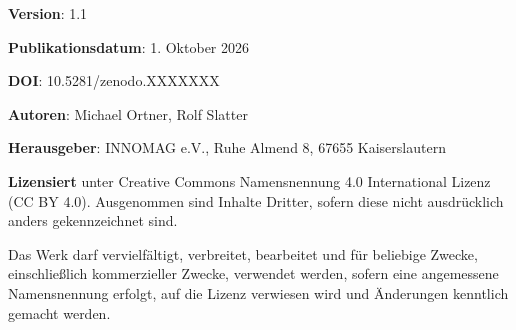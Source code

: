 \cleardoublepage
\thispagestyle{empty}

\textbf{Version}: 1.1

\textbf{Publikationsdatum}: 1. Oktober 2026

\textbf{DOI}: 10.5281/zenodo.XXXXXXX
\vspace{1.0cm}

\textbf{Autoren}: Michael Ortner, Rolf Slatter

\textbf{Herausgeber}: INNOMAG e.V., Ruhe Almend 8, 67655 Kaiserslautern
\vspace{1.0cm}

\textbf{Lizensiert} unter Creative Commons Namensnennung 4.0 International Lizenz (CC BY 4.0). Ausgenommen sind Inhalte Dritter, sofern diese nicht ausdrücklich anders gekennzeichnet sind.

Das Werk darf vervielfältigt, verbreitet, bearbeitet und für beliebige Zwecke, einschließlich kommerzieller Zwecke, verwendet werden, sofern eine angemessene Namensnennung erfolgt, auf die Lizenz verwiesen wird und Änderungen kenntlich gemacht werden.

\cleardoublepage
